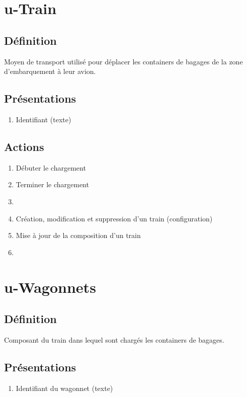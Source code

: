 \section{u-Train}
\subsection{Définition}
	Moyen de transport utilisé pour déplacer les containers de bagages de la zone d'embarquement à leur avion.

\subsection{Présentations}
\begin{enumerate}
	\item Identifiant (texte)
\end{enumerate}

\subsection{Actions}
\begin{enumerate}
	\item Débuter le chargement
	\item Terminer le chargement
	\item {}
	\item Création, modification et suppression d'un train (configuration)
	\item Mise à jour de la composition d'un train
	\item \etat
\end{enumerate}

\section{u-Wagonnets}
\subsection{Définition}
	Composant du train dans lequel sont chargés les containers de bagages.

\subsection{Présentations}
\begin{enumerate}
	\item Identifiant du wagonnet (texte)
\end{enumerate}

